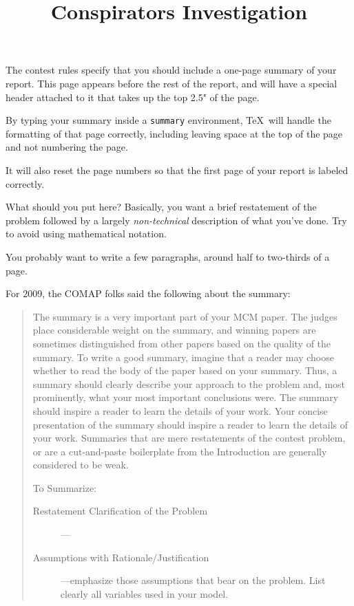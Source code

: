 \documentclass{icmmcm}
\title{Conspirators Investigation}
\begin{document}

\begin{summary}
  The contest rules specify that you should include a one-page summary
  of your report.  This page appears before the rest of the report,
  and will have a special header attached to it that takes up the top
  2.5" of the page.

  By typing your summary inside a \texttt{summary} environment, \TeX\ will
  handle the formatting of that page correctly, including leaving
  space at the top of the page and not numbering the page.
  
  It will also reset the page numbers so that the first page of your
  report is labeled correctly.
  
  What should you put here?  Basically, you want a brief restatement
  of the problem followed by a largely \emph{non-technical}
  description of what you've done.  Try to avoid using mathematical
  notation.
  
  You probably want to write a few paragraphs, around half to
  two-thirds of a page.

  For 2009, the COMAP folks said the following about the summary:
  \begin{quotation}
    The summary is a very important part of your MCM paper. The
    judges place considerable weight on the summary, and winning
    papers are sometimes distinguished from other papers based on
    the quality of the summary. To write a good summary, imagine
    that a reader may choose whether to read the body of the paper
    based on your summary. Thus, a summary should clearly describe
    your approach to the problem and, most prominently, what your
    most important conclusions were. The summary should inspire a
    reader to learn the details of your work.  Your concise
    presentation of the summary should inspire a reader to learn
    the details of your work. Summaries that are mere restatements
    of the contest problem, or are a cut-and-paste boilerplate
    from the Introduction are generally considered to be
    weak.

To Summarize:
\begin{description}
\item[Restatement Clarification of the Problem]
---

\item[Assumptions with Rationale/Justification]---emphasize those
  assumptions that bear on the problem. List clearly all variables
  used in your model.


\end{description}
\end{quotation}
\end{summary}
\end{document}
